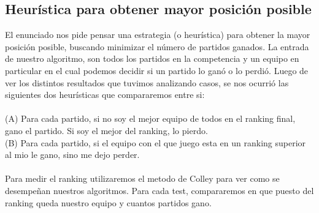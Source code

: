 \subsection{Heur\'istica para obtener mayor posici\'on posible}

El enunciado nos pide pensar una estrategia (o heur\'istica) para obtener la mayor posici\'on posible, buscando minimizar el n\'umero de partidos ganados. La entrada de nuestro algoritmo, son todos los partidos en la competencia y un equipo en particular en el cual podemos decidir si un partido lo gan\'o o lo perdi\'o. Luego de ver los distintos resultados que tuvimos analizando casos, se nos ocurri\'o las siguientes dos heur\'isticas que compararemos entre si:\\
\\
(A) Para cada partido, si no soy el mejor equipo de todos en el ranking final, gano el partido. Si soy el mejor del ranking, lo pierdo.\\
(B) Para cada partido, si el equipo con el que juego esta en un ranking superior al mio le gano, sino me dejo perder.\\
\\
Para medir el ranking utilizaremos el metodo de Colley para ver como se desempe\~nan nuestros algoritmos. Para cada test, compararemos en que puesto del ranking queda nuestro equipo y cuantos partidos gano.\\
